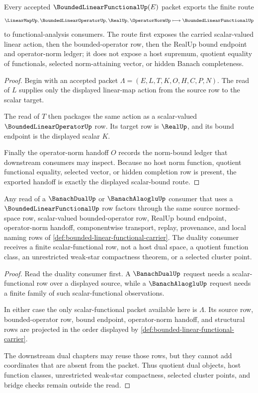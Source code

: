 \begin{theorem}
\label{thm:bounded-linear-functional-operator-norm-handoff}
Every accepted $\BoundedLinearFunctionalUp(E)$ packet exports the finite route
$$
\LinearMapUp,\BoundedLinearOperatorUp,\RealUp,\OperatorNormUp
\longmapsto
\BoundedLinearFunctionalUp
$$
to functional-analysis consumers. The route first exposes the carried scalar-valued linear action, then the bounded-operator row, then the RealUp bound endpoint and operator-norm ledger; it does not expose a host supremum, quotient equality of functionals, selected norm-attaining vector, or hidden Banach completeness.
\end{theorem}
\begin{proof}
Begin with an accepted packet $\Lambda=(E,L,T,K,O,H,C,P,N)$. The read of $L$ supplies only the displayed linear-map action from the source row to the scalar target.

The read of $T$ then packages the same action as a scalar-valued $\BoundedLinearOperatorUp$ row. Its target row is $\RealUp$, and its bound endpoint is the displayed scalar $K$.

Finally the operator-norm handoff $O$ records the norm-bound ledger that downstream consumers may inspect. Because no host norm function, quotient functional equality, selected vector, or hidden completion row is present, the exported handoff is exactly the displayed scalar-bound route.
\end{proof}

\begin{theorem}
\label{thm:bounded-linear-functional-dual-row-nonescape}
Any read of a $\BanachDualUp$ or $\BanachAlaogluUp$ consumer that uses a $\BoundedLinearFunctionalUp$ row factors through the same source normed-space row, scalar-valued bounded-operator row, RealUp bound endpoint, operator-norm handoff, componentwise transport, replay, provenance, and local naming rows of \autoref{def:bounded-linear-functional-carrier}. The duality consumer receives a finite scalar-functional row, not a host dual space, a quotient function class, an unrestricted weak-star compactness theorem, or a selected cluster point.
\end{theorem}
\begin{proof}
Read the duality consumer first. A $\BanachDualUp$ request needs a scalar-functional row over a displayed source, while a $\BanachAlaogluUp$ request needs a finite family of such scalar-functional observations.

In either case the only scalar-functional packet available here is $\Lambda$. Its source row, bounded-operator row, bound endpoint, operator-norm handoff, and structural rows are projected in the order displayed by \autoref{def:bounded-linear-functional-carrier}.

The downstream dual chapters may reuse those rows, but they cannot add coordinates that are absent from the packet. Thus quotient dual objects, host function classes, unrestricted weak-star compactness, selected cluster points, and bridge checks remain outside the read.
\end{proof}

